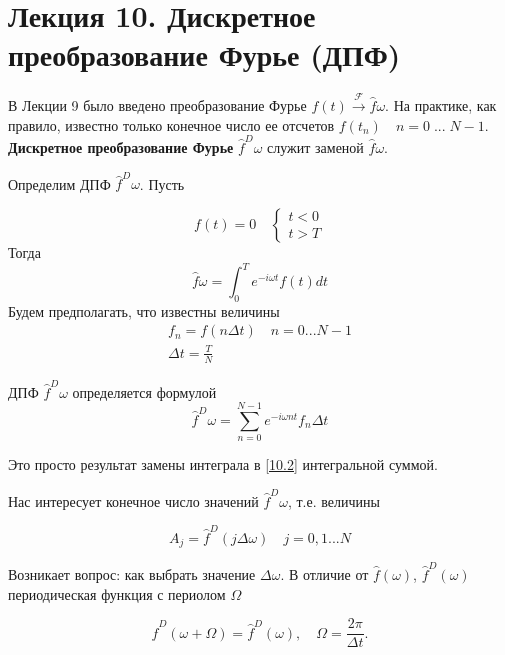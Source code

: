 \section{Лекция 10. Дискретное преобразование Фурье (ДПФ)}

В Лекции 9 было введено преобразование Фурье $f(t) \xrightarrow{\mathscr{F}} \hat{f}\omega$. На практике, как правило, известно только конечное число ее отсчетов $f(t_n)\quad n = 0 \; ...\;N-1$. \textbf{Дискретное преобразование Фурье} $\hat{f}^D\omega$ служит заменой $\hat{f}\omega$.

Определим ДПФ $\hat{f}^D\omega$. Пусть

\begin{equation}\label{10.1}
f(t) = 0 \quad
\begin{cases}
t < 0 \\
t > T
\end{cases}
\end{equation}
Тогда
\begin{equation}\label{10.2}
\hat{f}\omega = \int_{0}^{T}e^{-i\omega t}f(t)dt
\end{equation}
Будем предполагать, что известны величины
\begin{equation}\label{10.3}
\begin{gathered}
f_n = f(n \Delta t) \quad n = 0 ... N-1 \\
\Delta t = \frac{T}{N}
\end{gathered}
\end{equation}

ДПФ $\hat{f}^D\omega$ определяется формулой
\begin{equation}\label{10.4}
\hat{f}^D\omega = \sum_{n = 0}^{N - 1} e^{-i \omega nt}f_n\Delta t
\end{equation}

Это просто результат замены интеграла в \ref{10.2} интегральной суммой.

Нас интересует конечное число значений $\hat{f}^D\omega$, т.е. величины 

\begin{equation}\label{10.5}
A_j = \hat{f}^D(j \Delta \omega) \quad j = 0, 1 ... N
\end{equation}

Возникает вопрос: как выбрать значение $\Delta \omega$.
В отличие от $ \hat{f}(\omega)$, $\hat{f}^D(\omega)$ периодическая функция с периолом $\Omega$

\begin{equation}\label{10.6}
\hat{f}^D(\omega + \Omega) = \hat{f}^D(\omega), \quad \Omega = \frac{2\pi}{\Delta t}.
\end{equation}

